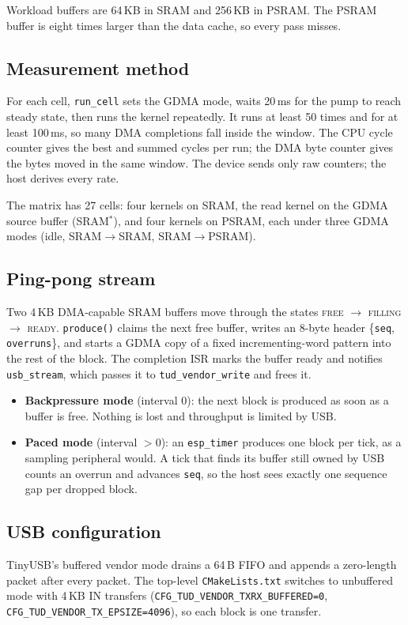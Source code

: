 \documentclass[11pt,a4paper]{article}
\begin{document}
\noindent Workload buffers are 64\,KB in SRAM and 256\,KB in PSRAM. The PSRAM buffer is eight times
larger than the data cache, so every pass misses.

\subsection{Measurement method}
For each cell, \texttt{run\_cell} sets the GDMA mode, waits 20\,ms for the pump to reach steady
state, then runs the kernel repeatedly. It runs at least 50 times and for at least 100\,ms, so many
DMA completions fall inside the window. The CPU cycle counter gives the best and summed cycles per
run; the DMA byte counter gives the bytes moved in the same window. The device sends only raw
counters; the host derives every rate.

The matrix has 27 cells: four kernels on SRAM, the read kernel on the GDMA source buffer
(SRAM$^*$), and four kernels on PSRAM, each under three GDMA modes (idle, SRAM$\to$SRAM,
SRAM$\to$PSRAM).

\subsection{Ping-pong stream}
Two 4\,KB DMA-capable SRAM buffers move through the states \textsc{free} $\to$ \textsc{filling}
$\to$ \textsc{ready}. \texttt{produce()} claims the next free buffer, writes an 8-byte header
\{\texttt{seq}, \texttt{overruns}\}, and starts a GDMA copy of a fixed incrementing-word pattern into
the rest of the block. The completion ISR marks the buffer ready and notifies \texttt{usb\_stream},
which passes it to \texttt{tud\_vendor\_write} and frees it.

\begin{itemize}
  \item \textbf{Backpressure mode} (interval 0): the next block is produced as soon as a buffer is
        free. Nothing is lost and throughput is limited by USB.
  \item \textbf{Paced mode} (interval $>0$): an \texttt{esp\_timer} produces one block per tick, as a
        sampling peripheral would. A tick that finds its buffer still owned by USB counts an overrun
        and advances \texttt{seq}, so the host sees exactly one sequence gap per dropped block.
\end{itemize}

\subsection{USB configuration}
TinyUSB's buffered vendor mode drains a 64\,B FIFO and appends a zero-length packet after every
packet. The top-level \texttt{CMakeLists.txt} switches to unbuffered mode with 4\,KB IN transfers
(\texttt{CFG\_TUD\_VENDOR\_TXRX\_BUFFERED=0}, \texttt{CFG\_TUD\_VENDOR\_TX\_EPSIZE=4096}), so each block
is one transfer.
\end{document}
